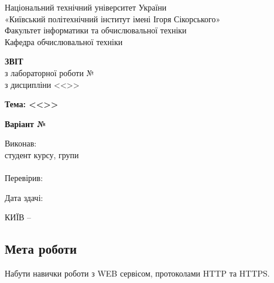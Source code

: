 \documentclass[14pt, a4paper]{extreport}
\begin{document}
	
	\begin{titlepage}
		\begin{center}
			\normalsize
			Національний технічний університет України\\
			«Київський політехнічний інститут імені Ігоря Сікорського» \\[0.5em]
			Факультет інформатики та обчислювальної техніки\\
			Кафедра обчислювальної техніки
			
			\vfill
			
			{\large \textbf{ЗВІТ}\\[0.5em]}
			{з лабораторної роботи №\LabNumber \\}
			{з дисципліни <<\CourseTitle>>}
			
			\vspace{2em}
			
			{\textbf{Тема: <<\Topic>>}}
			
			\vspace{1em}
			
			{\textbf{Варіант №\Variant}}
			
			\vfill
			
			\begin{flushright}
				Виконав: \\ студент \CourseNumber{} курсу, групи \StudentGroup \\
				\StudentName \\[1em]
				Перевірив: \\ \Teacher
			\end{flushright}
			
			\vfill
			
			\begin{flushright}
				Дата здачі: \DTMtoday
			\end{flushright}
			
			\vspace{5em}
			КИЇВ -- \ReportYear
		\end{center}
	\end{titlepage}
	
	\clearpage
	\setcounter{page}{2}
	
	\subsection*{Мета роботи} 
	
	Набути навички роботи з WEB сервісом, протоколами HTTP та HTTPS.
	
\end{document}
